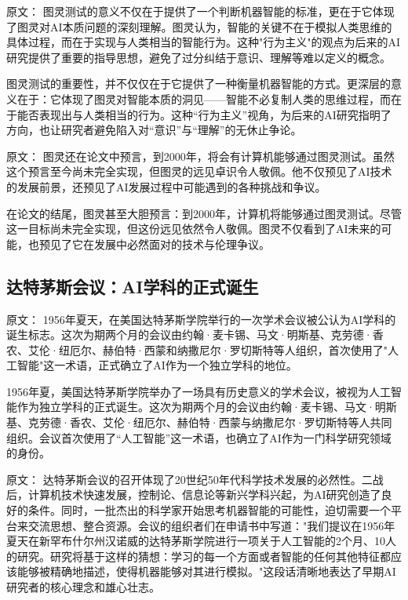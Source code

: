 原文：
图灵测试的意义不仅在于提供了一个判断机器智能的标准，更在于它体现了图灵对AI本质问题的深刻理解。图灵认为，智能的关键不在于模拟人类思维的具体过程，而在于实现与人类相当的智能行为。这种"行为主义"的观点为后来的AI研究提供了重要的指导思想，避免了过分纠结于意识、理解等难以定义的概念。

图灵测试的重要性，并不仅仅在于它提供了一种衡量机器智能的方式。更深层的意义在于：它体现了图灵对智能本质的洞见——智能不必复制人类的思维过程，而在于能否表现出与人类相当的行为。这种“行为主义”视角，为后来的AI研究指明了方向，也让研究者避免陷入对“意识”与“理解”的无休止争论。

原文：
图灵还在论文中预言，到2000年，将会有计算机能够通过图灵测试。虽然这个预言至今尚未完全实现，但图灵的远见卓识令人敬佩。他不仅预见了AI技术的发展前景，还预见了AI发展过程中可能遇到的各种挑战和争议。

在论文的结尾，图灵甚至大胆预言：到2000年，计算机将能够通过图灵测试。尽管这一目标尚未完全实现，但这份远见依然令人敬佩。图灵不仅看到了AI未来的可能，也预见了它在发展中必然面对的技术与伦理争议。

\subsection{达特茅斯会议：AI学科的正式诞生}

原文：
1956年夏天，在美国达特茅斯学院举行的一次学术会议被公认为AI学科的诞生标志。这次为期两个月的会议由约翰·麦卡锡、马文·明斯基、克劳德·香农、艾伦·纽厄尔、赫伯特·西蒙和纳撒尼尔·罗切斯特等人组织，首次使用了"人工智能"这一术语，正式确立了AI作为一个独立学科的地位。

1956年夏，美国达特茅斯学院举办了一场具有历史意义的学术会议，被视为人工智能作为独立学科的正式诞生。这次为期两个月的会议由约翰·麦卡锡、马文·明斯基、克劳德·香农、艾伦·纽厄尔、赫伯特·西蒙与纳撒尼尔·罗切斯特等人共同组织。会议首次使用了“人工智能”这一术语，也确立了AI作为一门科学研究领域的身份。

原文：
达特茅斯会议的召开体现了20世纪50年代科学技术发展的必然性。二战后，计算机技术快速发展，控制论、信息论等新兴学科兴起，为AI研究创造了良好的条件。同时，一批杰出的科学家开始思考机器智能的可能性，迫切需要一个平台来交流思想、整合资源。会议的组织者们在申请书中写道："我们提议在1956年夏天在新罕布什尔州汉诺威的达特茅斯学院进行一项关于人工智能的2个月、10人的研究。研究将基于这样的猜想：学习的每一个方面或者智能的任何其他特征都应该能够被精确地描述，使得机器能够对其进行模拟。"这段话清晰地表达了早期AI研究者的核心理念和雄心壮志。


